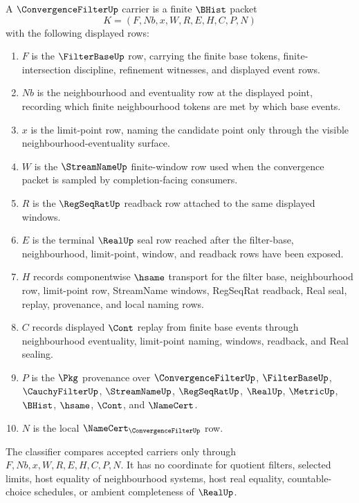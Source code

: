 \begin{definition}\label{def:convergence-filter-carrier}
A $\ConvergenceFilterUp$ carrier is a finite $\BHist$ packet
$$
K=(F,Nb,x,W,R,E,H,C,P,N)
$$
with the following displayed rows:
\begin{enumerate}
\item $F$ is the $\FilterBaseUp$ row, carrying the finite base tokens, finite-intersection discipline, refinement witnesses, and displayed event rows.
\item $Nb$ is the neighbourhood and eventuality row at the displayed point, recording which finite neighbourhood tokens are met by which base events.
\item $x$ is the limit-point row, naming the candidate point only through the visible neighbourhood-eventuality surface.
\item $W$ is the $\StreamNameUp$ finite-window row used when the convergence packet is sampled by completion-facing consumers.
\item $R$ is the $\RegSeqRatUp$ readback row attached to the same displayed windows.
\item $E$ is the terminal $\RealUp$ seal row reached after the filter-base, neighbourhood, limit-point, window, and readback rows have been exposed.
\item $H$ records componentwise $\hsame$ transport for the filter base, neighbourhood row, limit-point row, StreamName windows, RegSeqRat readback, Real seal, replay, provenance, and local naming rows.
\item $C$ records displayed $\Cont$ replay from finite base events through neighbourhood eventuality, limit-point naming, windows, readback, and Real sealing.
\item $P$ is the $\Pkg$ provenance over $\ConvergenceFilterUp$, $\FilterBaseUp$, $\CauchyFilterUp$, $\StreamNameUp$, $\RegSeqRatUp$, $\RealUp$, $\MetricUp$, $\BHist$, $\hsame$, $\Cont$, and $\NameCert$.
\item $N$ is the local $\NameCert_{\ConvergenceFilterUp}$ row.
\end{enumerate}
The classifier compares accepted carriers only through $F,Nb,x,W,R,E,H,C,P,N$. It has no coordinate for quotient filters, selected limits, host equality of neighbourhood systems, host real equality, countable-choice schedules, or ambient completeness of $\RealUp$.
\end{definition}

